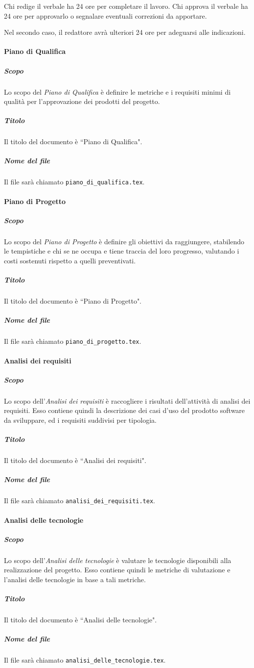 \documentclass[a4paper, 12pt]{article}
\begin{document}
Chi redige il verbale ha 24 ore per completare il lavoro. Chi approva il verbale ha 24 ore per approvarlo o segnalare eventuali correzioni da apportare.

Nel secondo caso, il redattore avrà ulteriori 24 ore per adeguarsi alle indicazioni.

\paragraph{Piano di Qualifica}\label{documentazione-documenti-piano-di-qualifica}
\subparagraph{Scopo}
Lo scopo del \textit{Piano di Qualifica} è definire le metriche e i requisiti minimi di qualità per l'approvazione dei prodotti del progetto.
\subparagraph{Titolo}
Il titolo del documento è ``Piano di Qualifica".
\subparagraph{Nome del file}
Il file sarà chiamato \texttt{piano\_di\_qualifica.tex}.

\paragraph{Piano di Progetto}\label{piano-di-progetto}
\subparagraph{Scopo}
Lo scopo del \textit{Piano di Progetto} è definire gli obiettivi da raggiungere, stabilendo le tempistiche e chi se ne occupa e tiene traccia del loro progresso, valutando i costi sostenuti rispetto a quelli preventivati.
\subparagraph{Titolo}
Il titolo del documento è ``Piano di Progetto".
\subparagraph{Nome del file}
Il file sarà chiamato \texttt{piano\_di\_progetto.tex}.

\paragraph{Analisi dei requisiti}\label{analisi-dei-requisiti}
\subparagraph{Scopo}
Lo scopo dell'\textit{Analisi dei requisiti} è raccogliere i risultati dell’attività di analisi dei requisiti. Esso contiene quindi la descrizione dei casi d’uso del prodotto software da sviluppare, ed i requisiti suddivisi per tipologia.
\subparagraph{Titolo}
Il titolo del documento è ``Analisi dei requisiti".
\subparagraph{Nome del file}
Il file sarà chiamato \texttt{analisi\_dei\_requisiti.tex}.

\paragraph{Analisi delle tecnologie}\label{analisi-delle-tecnologie}
\subparagraph{Scopo}
Lo scopo dell'\textit{Analisi delle tecnologie} è valutare le tecnologie disponibili alla realizzazione del progetto. Esso contiene quindi le metriche di valutazione e l'analisi delle tecnologie in base a tali metriche.
\subparagraph{Titolo}
Il titolo del documento è ``Analisi delle tecnologie".
\subparagraph{Nome del file}
Il file sarà chiamato \texttt{analisi\_delle\_tecnologie.tex}.
\end{document}
